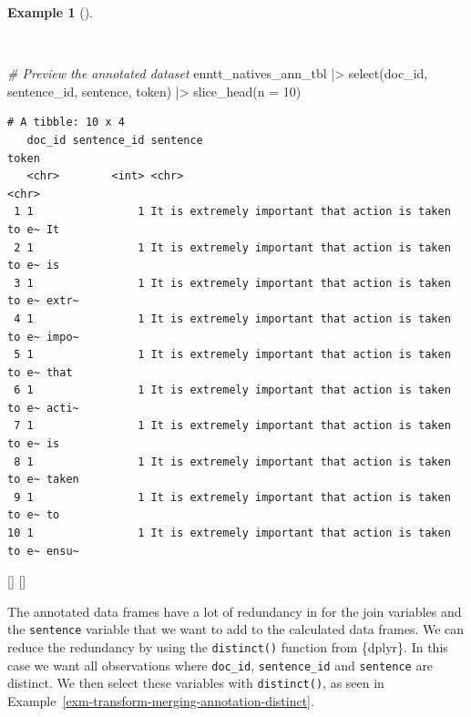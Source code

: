 \documentclass[
  letterpaper,
  krantz1]{latex/krantz-mod}
\newenvironment{Shaded}{\begin{snugshade}}{\end{snugshade}}
\newcommand{\AttributeTok}[1]{\textcolor[rgb]{0.00,0.00,0.00}{#1}}
\newcommand{\CommentTok}[1]{\textcolor[rgb]{0.00,0.00,0.00}{\textit{#1}}}
\newcommand{\DecValTok}[1]{\textcolor[rgb]{0.00,0.00,0.00}{#1}}
\newcommand{\FunctionTok}[1]{\textcolor[rgb]{0.00,0.00,0.00}{#1}}
\newcommand{\NormalTok}[1]{\textcolor[rgb]{0.00,0.00,0.00}{#1}}
\newcommand{\SpecialCharTok}[1]{\textcolor[rgb]{0.00,0.00,0.00}{#1}}
\newcommand{\cindex}[1]{%
  \StrSubstitute{#1}{_}{\_}[\temp]%
  \index{\temp}%
}
\theoremstyle{definition}
\theoremstyle{definition}
\newtheorem{example}{Example}[chapter]
\theoremstyle{remark}
\begin{document}
\begin{example}[]\protect\hypertarget{exm-transform-merging-join-prepped-syn-comp-ann}{}\label{exm-transform-merging-join-prepped-syn-comp-ann}

~

\begin{Shaded}
\begin{Highlighting}[numbers=left,,]
\CommentTok{\# Preview the annotated dataset}
\NormalTok{enntt\_natives\_ann\_tbl }\SpecialCharTok{|\textgreater{}}
  \FunctionTok{select}\NormalTok{(doc\_id, sentence\_id, sentence, token) }\SpecialCharTok{|\textgreater{}}
  \FunctionTok{slice\_head}\NormalTok{(}\AttributeTok{n =} \DecValTok{10}\NormalTok{)}
\end{Highlighting}
\end{Shaded}

\begin{verbatim}
# A tibble: 10 x 4
   doc_id sentence_id sentence                                             token
   <chr>        <int> <chr>                                                <chr>
 1 1                1 It is extremely important that action is taken to e~ It   
 2 1                1 It is extremely important that action is taken to e~ is   
 3 1                1 It is extremely important that action is taken to e~ extr~
 4 1                1 It is extremely important that action is taken to e~ impo~
 5 1                1 It is extremely important that action is taken to e~ that 
 6 1                1 It is extremely important that action is taken to e~ acti~
 7 1                1 It is extremely important that action is taken to e~ is   
 8 1                1 It is extremely important that action is taken to e~ taken
 9 1                1 It is extremely important that action is taken to e~ to   
10 1                1 It is extremely important that action is taken to e~ ensu~
\end{verbatim}

\cindex{slice_head()}\cindex{select()}

\end{example}

The annotated data frames have a lot of redundancy in for the join
variables and the \texttt{sentence} variable that we want to add to the
calculated data frames. We can reduce the redundancy by using the
\texttt{distinct()} function from \{dplyr\}. In this case we want all
observations where \texttt{doc\_id}, \texttt{sentence\_id} and
\texttt{sentence} are distinct. We then select these variables with
\texttt{distinct()}, as seen in
Example~\ref{exm-transform-merging-annotation-distinct}.
\end{document}
